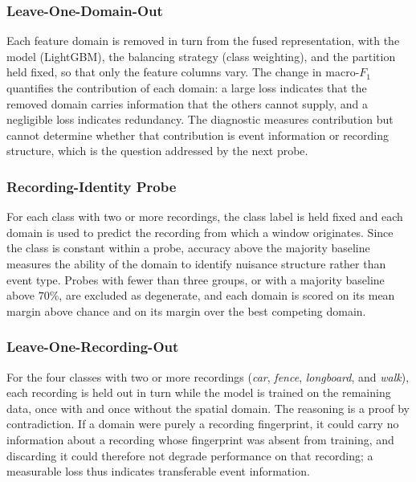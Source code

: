 \subsubsection{Leave-One-Domain-Out}
\label{sec:chap3LODO}
Each feature domain is removed in turn from the fused representation, with the model (LightGBM), the balancing strategy (class weighting), and the partition held fixed, so that only the feature columns vary. The change in macro-$F_1$ quantifies the contribution of each domain: a large loss indicates that the removed domain carries information that the others cannot supply, and a negligible loss indicates redundancy. The diagnostic measures contribution but cannot determine whether that contribution is event information or recording structure, which is the question addressed by the next probe.

\subsubsection{Recording-Identity Probe}
\label{sec:chap3Probe}
For each class with two or more recordings, the class label is held fixed and each domain is used to predict the recording from which a window originates. Since the class is constant within a probe, accuracy above the majority baseline measures the ability of the domain to identify nuisance structure rather than event type. Probes with fewer than three groups, or with a majority baseline above $70\%$, are excluded as degenerate, and each domain is scored on its mean margin above chance and on its margin over the best competing domain.

\subsubsection{Leave-One-Recording-Out}
\label{sec:chap3LORO}
For the four classes with two or more recordings (\emph{car}, \emph{fence}, \emph{longboard}, and \emph{walk}), each recording is held out in turn while the model is trained on the remaining data, once with and once without the spatial domain. The reasoning is a proof by contradiction. If a domain were purely a recording fingerprint, it could carry no information about a recording whose fingerprint was absent from training, and discarding it could therefore not degrade performance on that recording; a measurable loss thus indicates transferable event information.

